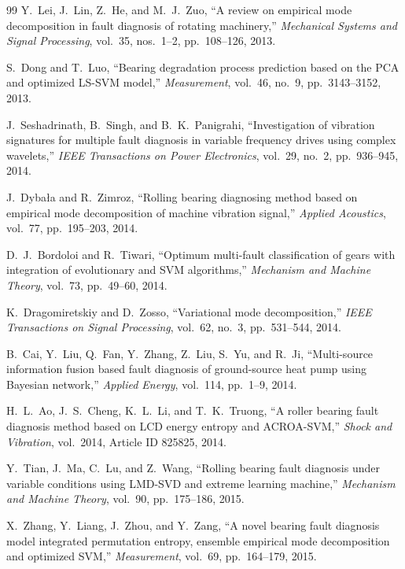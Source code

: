 \begin{thebibliography}{99}
Y.~Lei, J.~Lin, Z.~He, and M.~J.~Zuo,
``A review on empirical mode decomposition in fault diagnosis of rotating machinery,''
\textit{Mechanical Systems and Signal Processing}, vol.~35, nos.~1--2, pp.~108--126, 2013.

S.~Dong and T.~Luo,
``Bearing degradation process prediction based on the PCA and optimized LS-SVM model,''
\textit{Measurement}, vol.~46, no.~9, pp.~3143--3152, 2013.

J.~Seshadrinath, B.~Singh, and B.~K.~Panigrahi,
``Investigation of vibration signatures for multiple fault diagnosis in variable frequency drives using complex wavelets,''
\textit{IEEE Transactions on Power Electronics}, vol.~29, no.~2, pp.~936--945, 2014.

J.~Dyba{\l}a and R.~Zimroz,
``Rolling bearing diagnosing method based on empirical mode decomposition of machine vibration signal,''
\textit{Applied Acoustics}, vol.~77, pp.~195--203, 2014.

D.~J.~Bordoloi and R.~Tiwari,
``Optimum multi-fault classification of gears with integration of evolutionary and SVM algorithms,''
\textit{Mechanism and Machine Theory}, vol.~73, pp.~49--60, 2014.

K.~Dragomiretskiy and D.~Zosso,
``Variational mode decomposition,''
\textit{IEEE Transactions on Signal Processing}, vol.~62, no.~3, pp.~531--544, 2014.

B.~Cai, Y.~Liu, Q.~Fan, Y.~Zhang, Z.~Liu, S.~Yu, and R.~Ji,
``Multi-source information fusion based fault diagnosis of ground-source heat pump using Bayesian network,''
\textit{Applied Energy}, vol.~114, pp.~1--9, 2014.

H.~L.~Ao, J.~S.~Cheng, K.~L.~Li, and T.~K.~Truong,
``A roller bearing fault diagnosis method based on LCD energy entropy and ACROA-SVM,''
\textit{Shock and Vibration}, vol.~2014, Article ID 825825, 2014.

Y.~Tian, J.~Ma, C.~Lu, and Z.~Wang,
``Rolling bearing fault diagnosis under variable conditions using LMD-SVD and extreme learning machine,''
\textit{Mechanism and Machine Theory}, vol.~90, pp.~175--186, 2015.

X.~Zhang, Y.~Liang, J.~Zhou, and Y.~Zang,
``A novel bearing fault diagnosis model integrated permutation entropy, ensemble empirical mode decomposition and optimized SVM,''
\textit{Measurement}, vol.~69, pp.~164--179, 2015.


\end{thebibliography}

